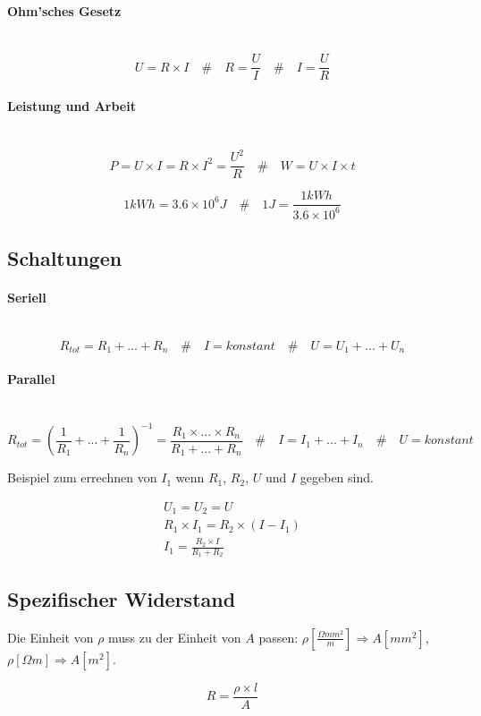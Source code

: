 \documentclass[a4paper,10pt]{article}
\newcommand{\lbparagraph}[1]{\paragraph{#1}\mbox{}\\}
\newcommand{\eqsp}[1]{\quad\#\quad}
\begin{document}
\lbparagraph{Ohm'sches Gesetz}

\begin{equation}
    U = R \times I
    \eqsp{}
    R = \frac{U}{I}
    \eqsp{}
    I = \frac{U}{R}
\end{equation}

\lbparagraph{Leistung und Arbeit}

\begin{equation}
    P = U \times I = R \times I^2 = \frac{U^2}{R}
    \eqsp{}
    W = U \times I \times t
\end{equation}

\begin{equation}
    1kWh = 3.6 \times 10^6J
    \eqsp{}
    1J = \frac{1kWh}{3.6 \times 10^6}
\end{equation}

\subsection{Schaltungen}

\lbparagraph{Seriell}

\begin{equation}
    R_{tot} = R_1 + ... + R_n
    \eqsp{}
    I = konstant
    \eqsp{}
    U = U_1 + ... + U_n
\end{equation}

\lbparagraph{Parallel}

\begin{equation}
    R_{tot} = (\frac{1}{R_1} + ... + \frac{1}{R_n})^{-1} = \frac{R_1 \times ... \times R_n}{R_1 + ... + R_n}
    \eqsp{}
    I = I_1 + ... + I_n
    \eqsp{}
    U = konstant
\end{equation}

Beispiel zum errechnen von $I_1$ wenn $R_1$, $R_2$, $U$ und $I$ gegeben sind.

\begin{gather}
    U_1 = U_2 = U \\
    R_1 \times I_1 = R_2 \times (I - I_1) \\
    I_1 = \frac{R_2 \times I}{R_1 + R_2}
\end{gather}

\subsection{Spezifischer Widerstand}
Die Einheit von $\rho$ muss zu der Einheit von $A$ passen: $\rho[\frac{{\Omega}mm^2}{m}] \Rightarrow A[mm^2]$, $\rho[{\Omega}m] \Rightarrow A[m^2]$.

\begin{equation}
    R = \frac{\rho \times l}{A}
\end{equation}
\end{document}
